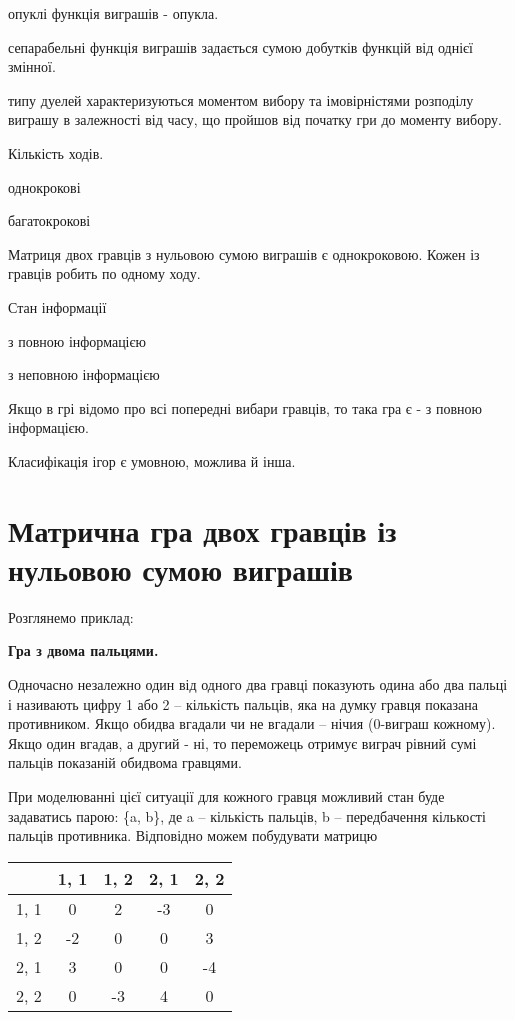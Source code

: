 \documentclass[12pt,a4paper]{book}
\newenvironment{slim_enumerate}{
\begin{enumerate}
  \setlength{\itemsep}{1pt}
  \setlength{\parskip}{0pt}
  \setlength{\parsep}{0pt}}
{\end{enumerate}}
\newenvironment{slim_itemize}{
\begin{itemize}
  \setlength{\itemsep}{1pt}
  \setlength{\parskip}{0pt}
  \setlength{\parsep}{0pt}}
{\end{itemize}}
\newenvironment{slim_description}{
\begin{description}
  \setlength{\itemsep}{2pt}
  \setlength{\parskip}{0pt}
  \setlength{\parsep}{0pt}}
{\end{description}}
\begin{document}
\begin{slim_enumerate}
\begin{slim_description}
    \item[опуклі] функція виграшів - опукла.
    \item[сепарабельні] функція виграшів задається сумою добутків функцій від однієї змінної.
    \item[типу дуелей] характеризуються моментом вибору та імовірністями розподілу виграшу в залежності від часу, що пройшов від початку гри до моменту вибору.
  \end{slim_description}
  \item Кількість ходів.
  \begin{slim_itemize}
    \item однокрокові
    \item багатокрокові
  \end{slim_itemize}
  Матриця двох гравців з нульовою сумою виграшів є однокроковою. Кожен із гравців робить по одному ходу.
  \item Стан інформації
  \begin{slim_itemize}
    \item з повною інформацією
    \item з неповною інформацією
  \end{slim_itemize}
  Якщо в грі відомо про всі попередні вибари гравців, то така гра є - з повною інформацією.
\end{slim_enumerate}

Класифікація ігор є умовною, можлива й інша.

\section{Матрична гра двох гравців із нульовою сумою виграшів}

Розглянемо приклад:

{\bf Гра з двома пальцями.}

Одночасно незалежно один від одного два гравці показують одина або два пальці і називають цифру 1 або 2 -- кількість пальців, яка на думку гравця показана противником. Якщо обидва вгадали чи не вгадали -- нічия (0-виграш кожному). Якщо один вгадав, а другий - ні, то переможець отримує виграч рівний сумі пальців показаній обидвома гравцями.

При моделюванні цієї ситуації для кожного гравця можливий стан буде задаватись парою: \{a, b\}, де a -- кількість пальців, b -- передбачення кількості пальців противника.
Відповідно можем побудувати матрицю

\begin{tabular}{ r | c | c | c | c | }
         & 1, 1 & 1, 2 & 2, 1 & 2, 2 \\ \hline
  1, 1 & 0 & 2 & -3 & 0 \\ \hline
  1, 2 & -2 & 0 & 0 & 3 \\ \hline
  2, 1 & 3 & 0 & 0 & -4 \\ \hline
  2, 2 & 0 & -3 & 4 & 0 \\ \hline
\end{tabular}
\end{document}
